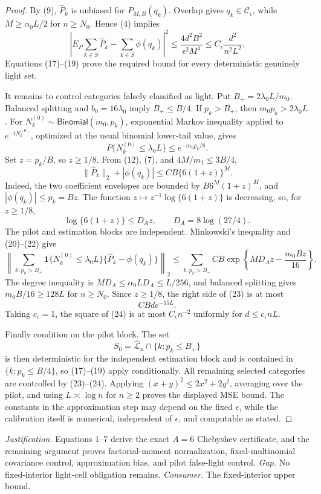 \documentclass{article}
\begin{document}
\begin{proof}
By (9), \(\widehat P_k\) is unbiased for \(P_{M,B}(q_k)\). Overlap gives \(q_k\in\mathcal C_\epsilon\), while \(M\ge\alpha_0L/2\) for \(n\ge N_0\). Hence (4) implies
\[
\left|E_P\sum_{k\in S}\widehat P_k-\sum_{k\in S}\phi(q_k)\right|^2\le\frac{4d^2B^2}{\epsilon^2M^4}\le C_\epsilon\frac{d^2}{n^2L^2}.
\tag{19}
\]
Equations (17)--(19) prove the required bound for every deterministic genuinely light set.

It remains to control categories falsely classified as light. Put \(B_+=2\lambda_0L/m_0\). Balanced splitting and \(b_0=16\lambda_0\) imply \(B_+\le B/4\). If \(p_k>B_+\), then \(m_0p_k>2\lambda_0L\). For \(N_k^{(0)}\sim\mathsf{Binomial}(m_0,p_k)\), exponential Markov inequality applied to \(e^{-tN_k^{(0)}}\), optimized at the usual binomial lower-tail value, gives
\[
P\{N_k^{(0)}\le\lambda_0L\}\le e^{-m_0p_k/8}.
\tag{20}
\]
Set \(z=p_k/B\), so \(z\ge1/8\). From (12), (7), and \(4M/m_1\le3B/4\),
\[
\|\widehat P_k\|_2+|\phi(q_k)|\le CB\{6(1+z)\}^{M}.
\tag{21}
\]
Indeed, the two coefficient envelopes are bounded by \(B6^M(1+z)^M\), and \(|\phi(q_k)|\le p_k=Bz\). The function \(z\mapsto z^{-1}\log\{6(1+z)\}\) is decreasing, so, for \(z\ge1/8\),
\[
\log\{6(1+z)\}\le D_Az,\qquad D_A=8\log(27/4).
\tag{22}
\]
The pilot and estimation blocks are independent. Minkowski's inequality and (20)--(22) give
\[
\left\|\sum_{k:p_k>B_+}\mathbf1\{N_k^{(0)}\le\lambda_0L\}\{\widehat P_k-\phi(q_k)\}\right\|_2\le\sum_{k:p_k>B_+}CB\exp\left\{MD_Az-\frac{m_0Bz}{16}\right\}.
\tag{23}
\]
The degree inequality is \(MD_A\le\alpha_0LD_A\le L/256\), and balanced splitting gives \(m_0B/16\ge128L\) for \(n\ge N_0\). Since \(z\ge1/8\), the right side of (23) is at most
\[
CBd e^{-15L}.
\tag{24}
\]
Taking \(c_\epsilon=1\), the square of (24) is at most \(C_\epsilon n^{-2}\) uniformly for \(d\le c_\epsilon nL\).

Finally condition on the pilot block. The set
\[
S_0=\widehat{\mathcal L}_n\cap\{k:p_k\le B_+\}
\tag{25}
\]
is then deterministic for the independent estimation block and is contained in \(\{k:p_k\le B/4\}\), so (17)--(19) apply conditionally. All remaining selected categories are controlled by (23)--(24). Applying \((x+y)^2\le2x^2+2y^2\), averaging over the pilot, and using \(L\asymp\log n\) for \(n\ge2\) proves the displayed MSE bound. The constants in the approximation step may depend on the fixed \(\epsilon\), while the calibration itself is numerical, independent of \(\epsilon\), and computable as stated.
\end{proof}
\par\smallskip\noindent \textit{Justification.} Equations \(1\)--\(7\) derive the exact \(A=6\) Chebyshev certificate, and the remaining argument proves factorial-moment normalization, fixed-multinomial covariance control, approximation bias, and pilot false-light control. \textit{Gap.} No fixed-interior light-cell obligation remains. \textit{Consumer.} The fixed-interior upper bound.
\end{document}
